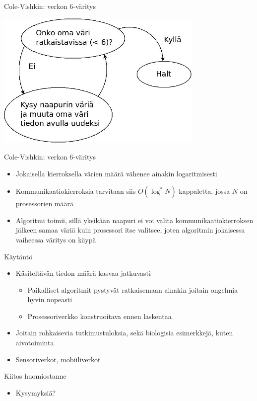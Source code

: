 \documentclass[a4paper, 12pt, finnish]{beamer}
\begin{document}
\begin{frame}{Cole-Vishkin: verkon 6-väritys}
    \begin{center} 
        \includegraphics[width=0.75\textwidth]{Diagram12.jpeg} 
    \end{center} 
\end{frame}

\begin{frame}{Cole-Vishkin: verkon 6-väritys}
    \begin{itemize} 
        \item Jokaisella kierroksella värien määrä vähenee ainakin logaritmisesti
        \item Kommunikaatiokierroksia tarvitaan siis $O(\log^* N)$ kappaletta, jossa $N$ on prosessorien määrä
        \item Algoritmi toimii, sillä yksikään naapuri ei voi valita kommunikaatiokierroksen jälkeen samaa väriä kuin prosessori itse valitsee, joten algoritmin jokaisessa vaiheessa väritys on käypä
    \end{itemize} 
\end{frame}

\begin{frame}{Käytäntö}
    \begin{itemize}
        \item Käsiteltävän tiedon määrä kasvaa jatkuvasti
        \begin{itemize}
            \item Paikalliset algoritmit pystyvät ratkaisemaan ainakin joitain ongelmia hyvin nopeasti 
            \item Prosessoriverkko konstruoitava ennen laskentaa
        \end{itemize}
        \item Joitain rohkaisevia tutkimustuloksia, sekä biologisia esimerkkejä, kuten aivotoiminta
        \item Sensoriverkot, mobiiliverkot
    \end{itemize}
\end{frame}

\begin{frame}{Kiitos huomiostanne}
    \begin{itemize}
        \item Kysymyksiä?
    \end{itemize}
\end{frame}
\end{document}
